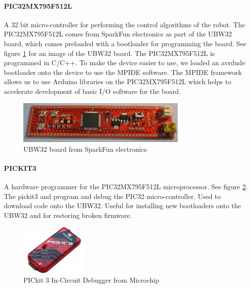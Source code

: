 \documentclass[titlepage,letterpaper,12pt]{article}
\begin{document}
\paragraph{PIC32MX795F512L}A 32 bit micro-controller for performing the control
algorithms of the robot. The PIC32MX795F512L comes from SparkFun electronics as
part of the UBW32 board, which comes preloaded with a bootloader for programming
the board. See figure \ref{ubw32fig} for an image of the UBW32 board. The
PIC32MX795F512L is programmed in C/C++. To make the device easier to use, we
loaded an avrdude bootloader onto the device to use the MPIDE software. The
MPIDE framework allows us to use Arduino libraries on the PIC32MX795F512L which
helps to accelerate development of basic I/O software for the
board\cite{pic32data}.

\begin{figure}
  \centering
    \includegraphics[width=0.75\textwidth]{figures/UBW32_v24_SparkFun.JPG}
  \caption{UBW32 board from SparkFun electronics\protect\cite{Schmalz2013}}
  \label{ubw32fig}
\end{figure}

\paragraph{PICKIT3}A hardware programmer for the PIC32MX795F512L
microprocessor. See figure \ref{pickit3fig}. The pickit3 and program and debug
the PIC32 micro-controller.  Used to download code onto the UBW32. Useful for
installing new bootloaders onto the UBW32 and for restoring broken
firmware\cite{pickitdata}.

\begin{figure}
  \centering
    \includegraphics[width=0.3\textwidth]{figures/pickit3.jpg}
  \caption{PICkit 3 In-Circuit Debugger from Microchip\protect\cite{pickitfigcite}}
  \label{pickit3fig}
\end{figure}
\end{document}
